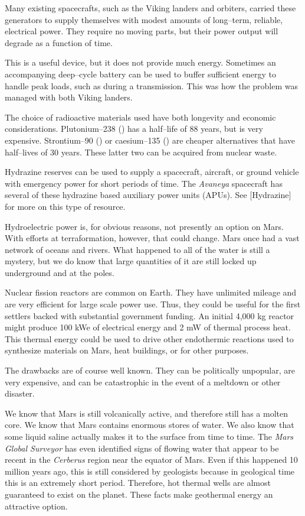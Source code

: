 Many existing spacecrafts, such as the Viking landers and orbiters, carried these generators to supply themselves with modest amounts of long--term, reliable, electrical power. They require no moving parts, but their power output will degrade as a function of time.

This is a useful device, but it does not provide much energy. Sometimes an accompanying deep--cycle battery can be used to buffer sufficient energy to handle peak loads, such as during a transmission. This was how the problem was managed with both Viking landers.

The choice of radioactive materials used have both longevity and economic considerations. Plutonium--238 () has a half--life of 88 years, but is very expensive. Strontium--90 () or caesium--135 () are cheaper alternatives that have half--lives of 30 years. These latter two can be acquired from nuclear waste.

Hydrazine reserves can be used to supply a spacecraft, aircraft, or ground vehicle with emergency power for short periods of time. The {\it Avaneya} spacecraft has several of these hydrazine based auxiliary power units (APUs). See [Hydrazine] for more on this type of resource.

Hydroelectric power is, for obvious reasons, not presently an option on Mars. With efforts at terraformation, however, that could change. Mars once had a vast network of oceans and rivers. What happened to all of the water is still a mystery, but we do know that large quantities of it are still locked up underground and at the poles.

Nuclear fission reactors are common on Earth. They have unlimited mileage and are very efficient for large scale power use. Thus, they could be useful for the first settlers backed with substantial government funding. An initial 4,000 kg reactor might produce 100 kWe of electrical energy and 2 mW of thermal process heat. This thermal energy could be used to drive other endothermic reactions used to synthesize materials on Mars, heat buildings, or for other purposes.

The drawbacks are of course well known. They can be politically unpopular, are very expensive, and can be catastrophic in the event of a meltdown or other disaster.

We know that Mars is still volcanically active, and therefore still has a molten core. We know that Mars contains enormous stores of water. We also know that some liquid saline actually makes it to the surface from time to time. The {\it Mars Global Surveyor} has even identified signs of flowing water that appear to be recent in the {\it Cerberus} region near the equator of Mars. Even if this happened 10 million years ago, this is still considered  by geologists because in geological time this is an extremely short period. Therefore, hot thermal wells are almost guaranteed to exist on the planet. These facts make geothermal energy an attractive option.

